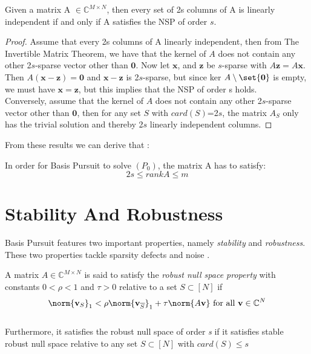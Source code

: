 \begin{theorem}
Given a matrix A $\in \mathbb{C}^{M \times N}$, then every set of 2s columns of A is linearly independent if and only if A satisfies the NSP of order $s$. 
\end{theorem}

\begin{proof}
Assume that every 2s columns of A linearly independent, then from The Invertible Matrix Theorem, we have that the kernel of $A$ does not contain any other 2$s$-sparse vector other than $\mathbf{0}$. Now let $\mathbf{x}$, and $\mathbf{z}$ be $s$-sparse with $A\mathbf{z} = A\mathbf{x}$. Then $A(\mathbf{x}-\mathbf{z}) = \mathbf{0}$ and $\mathbf{x}-\mathbf{z}$ is 2$s$-sparse, but since ker $A \setminus \set{\mathbf{0}}$ is empty, we must have $\mathbf{x}=\mathbf{z}$, but this implies that the NSP of order s holds.
\\ Conversely, assume that the kernel of $A$ does not contain any other 2$s$-sparse vector other than $\mathbf{0}$, then for any set $S$ with $card(S)$=2$s$, the matrix $A_{S}$ only has the trivial solution and thereby 2$s$ linearly independent columns. 
\end{proof}

From these results we can derive that : 

\begin{corollary}
In order for Basis Pursuit to solve $(P_{0})$, the matrix A has to satisfy: 
\begin{equation*}
2s \leq rank A \leq m
\end{equation*}
\end{corollary}

\section*{Stability And Robustness}

Basis Pursuit features two important properties, namely \emph{stability} and  \emph{robustness}.
These two properties tackle sparsity defects and noise . 

\begin{definition}
A matrix $A \in \mathbb{C}^{M \times N}$ is said to satisfy the \emph{robust null space property} with constants $0 < \rho < 1$ and $ \tau > 0$ relative to a set $S \subset [N]$ if 
\begin{equation*}
\norm{ \mathbf{v}_{S}}_{1}  <  \rho \norm{ \mathbf{v}_{\overline{S}}}_{1} + \tau \norm{A\mathbf{v}} \ \text{for all} \ \mathbf{v} \in \mathbb{C}^{N}
\end{equation*}
\\ Furthermore, it satisfies the robust null space of order \emph{s} if it satisfies stable robust null space relative to any set $S \subset [N]$ with $card(S) \leq s$

\end{definition}



